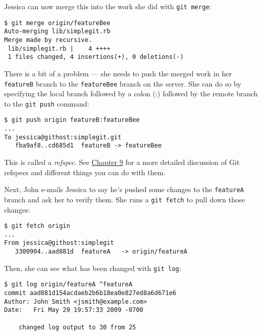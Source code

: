 \documentclass[a4paper]{book}
\newcommand{\prechap}{Chapter }
\newcommand{\postchap}{}
\newcommand{\chapref}[1]{\hyperref[chap:#1]{\prechap #1\postchap}}
\begin{document}
Jessica can now merge this into the work she did with \texttt{git merge}:

\begin{shaded}\begin{verbatim}
$ git merge origin/featureBee
Auto-merging lib/simplegit.rb
Merge made by recursive.
 lib/simplegit.rb |    4 ++++
 1 files changed, 4 insertions(+), 0 deletions(-)
\end{verbatim}\end{shaded}

There is a bit of a problem --- she needs to push the merged work in her \texttt{featureB} branch to the \texttt{featureBee} branch on the server. She can do so by specifying the local branch followed by a colon (:) followed by the remote branch to the \texttt{git push} command:

\begin{shaded}\begin{verbatim}
$ git push origin featureB:featureBee
...
To jessica@githost:simplegit.git
   fba9af8..cd685d1  featureB -> featureBee
\end{verbatim}\end{shaded}

This is called a \emph{refspec}. See \chapref{9} for a more detailed discussion of Git refspecs and different things you can do with them.

Next, John e-mails Jessica to say he's pushed some changes to the \texttt{featureA} branch and ask her to verify them. She runs a \texttt{git fetch} to pull down those changes:

\begin{shaded}\begin{verbatim}
$ git fetch origin
...
From jessica@githost:simplegit
   3300904..aad881d  featureA   -> origin/featureA
\end{verbatim}\end{shaded}

Then, she can see what has been changed with \texttt{git log}:

\begin{shaded}\begin{verbatim}
$ git log origin/featureA ^featureA
commit aad881d154acdaeb2b6b18ea0e827ed8a6d671e6
Author: John Smith <jsmith@example.com>
Date:   Fri May 29 19:57:33 2009 -0700

    changed log output to 30 from 25
\end{verbatim}\end{shaded}
\end{document}
